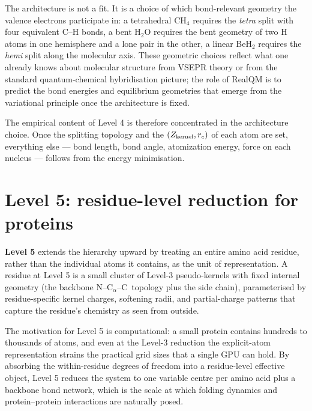 The architecture is not a fit. It is a choice of which bond-relevant geometry the valence electrons participate in: a tetrahedral CH$_4$ requires the \emph{tetra} split with four equivalent C--H bonds, a bent H$_2$O requires the bent geometry of two H atoms in one hemisphere and a lone pair in the other, a linear BeH$_2$ requires the \emph{hemi} split along the molecular axis. These geometric choices reflect what one already knows about molecular structure from VSEPR theory or from the standard quantum-chemical hybridisation picture; the role of RealQM is to predict the bond energies and equilibrium geometries that emerge from the variational principle once the architecture is fixed.

The empirical content of Level 4 is therefore concentrated in the architecture choice. Once the splitting topology and the $(Z_{\rm kernel}, r_c)$ of each atom are set, everything else --- bond length, bond angle, atomization energy, force on each nucleus --- follows from the energy minimisation.

\section{Level 5: residue-level reduction for proteins}\label{sec:level5}

\textbf{Level 5} extends the hierarchy upward by treating an entire amino acid residue, rather than the individual atoms it contains, as the unit of representation. A residue at Level 5 is a small cluster of Level-3 pseudo-kernels with fixed internal geometry (the backbone N--C$_\alpha$--C\ topology plus the side chain), parameterised by residue-specific kernel charges, softening radii, and partial-charge patterns that capture the residue's chemistry as seen from outside.

The motivation for Level 5 is computational: a small protein contains hundreds to thousands of atoms, and even at the Level-3 reduction the explicit-atom representation strains the practical grid sizes that a single GPU can hold. By absorbing the within-residue degrees of freedom into a residue-level effective object, Level 5 reduces the system to one variable centre per amino acid plus a backbone bond network, which is the scale at which folding dynamics and protein--protein interactions are naturally posed.

